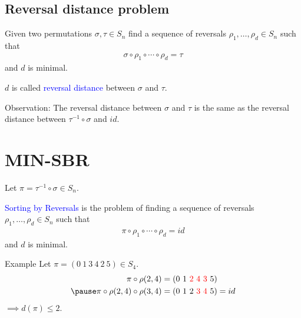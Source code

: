 \documentclass[handout]{beamer}
\theoremstyle{definition}
\def\padding{\vspace{0.5cm}}
\def\spadding{\vspace{0.25cm}}
\def\b{\textcolor{blue}}
\def\r{\textcolor{red}}
\begin{document}
\subsection{Reversal distance problem}

\begin{frame}

\begin{definition}
Given two permutations $\sigma, \tau \in S_n$ find a sequence of reversals $\rho_1, \dots, \rho_d \in S_n$ such that
\begin{align*}
    \sigma \circ \rho_1 \circ \cdots \circ \rho_d = \tau
\end{align*}
and $d$ is minimal. \pause\par\spadding
$d$ is called \b{reversal distance} between $\sigma$ and $\tau$.
\end{definition}\pause\padding

Observation: The reversal distance between $\sigma$ and $\tau$ is the same as the reversal distance between $\tau^{-1} \circ \sigma$ and $id$.

\end{frame}

\section{MIN-SBR}

\begin{frame}

\begin{definition}
Let $\pi = \tau^{-1} \circ \sigma \in S_n$. \par\pause
\b{Sorting by Reversals} is the problem of finding a sequence of reversals $\rho_1, \dots, \rho_d \in S_n$ such that
\begin{align*}
    \pi \circ \rho_1 \circ \cdots \circ \rho_d = id
\end{align*}
and $d$ is minimal.
\end{definition}\pause

\begin{exampleblock}{Example}
Let $\pi = (0\ 1\ 3\ 4\ 2\ 5) \in S_4$.\pause
\begin{align*}
    \pi \circ \rho(2,4) &= (0\ 1\ \r{2\ 4\ 3}\ 5) \\ \pause
    \pi \circ \rho(2,4) \circ \rho(3,4) &= (0\ 1\ 2\ \r{3\ 4}\ 5) = id
\end{align*}\pause
$\implies d(\pi) \leq 2$.
\end{exampleblock}

\end{frame}
\end{document}
